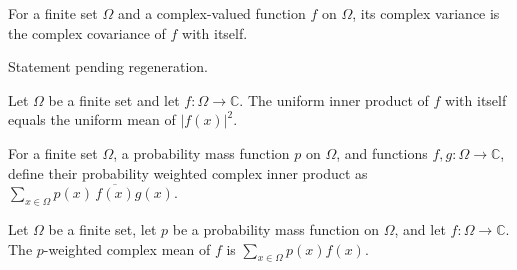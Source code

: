 \begin{definition}
\label{FABL.complexVariance}
\leanok
{}
For a finite set $\Omega$ and a complex-valued function $f$ on $\Omega$, its complex
variance is the complex covariance of $f$ with itself.
\end{definition}

\begin{theorem}
\label{FABL.complexUniformInner_eq_expect}
\leanok
{}
Statement pending regeneration.
\end{theorem}

\begin{theorem}
\label{FABL.complexUniformInner_self_eq_expect_absSq}
\leanok
{}
Let $\Omega$ be a finite set and let $f:\Omega\to\mathbb{C}$. The uniform inner product of $f$ with itself equals the uniform mean of $|f(x)|^2$.
\end{theorem}

\begin{definition}
\label{FABL.pmfComplexInner}
\leanok
For a finite set $\Omega$, a probability mass function $p$ on $\Omega$, and functions
$f,g:\Omega\to\mathbb{C}$, define their probability weighted complex inner product as
$\sum_{x\in\Omega}p(x)\,\overline{f(x)}g(x)$.
\end{definition}

\begin{definition}
\label{FABL.pmfComplexMean}
\leanok
Let $\Omega$ be a finite set, let $p$ be a probability mass function on $\Omega$, and
let $f:\Omega\to\mathbb{C}$. The $p$-weighted complex mean of $f$ is
$\sum_{x\in\Omega}p(x)f(x)$.
\end{definition}

